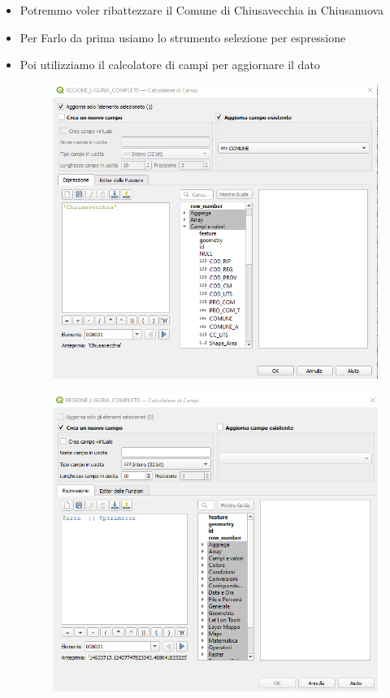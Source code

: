 \documentclass{beamer}
\begin{document}
{\begin{frame}
    \begin{itemize}
        \item Potremmo voler ribattezzare il Comune di Chiusavecchia in Chiusanuova
        \item Per Farlo da prima usiamo lo strumento selezione per espressione
        \item Poi utilizziamo il calcolatore di campi per aggiornare il dato
        \begin{figure}
            \centering
            \includegraphics[width=0.5\linewidth]{chiusavecchia .png}
            
            
        \end{figure}
        \begin{figure}
            \centering
            \includegraphics[width=0.60\linewidth]{areaperimetro.png}
            
            
        \end{figure}
    \end{itemize}    
   
\end{frame}

}
\end{document}
